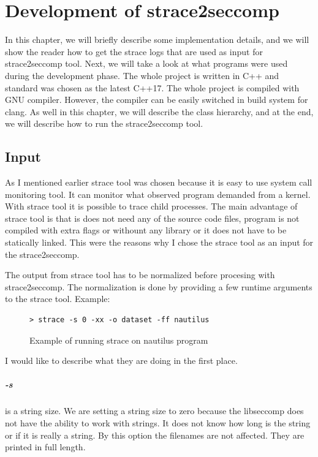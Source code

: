 \chapter{Development of strace2seccomp}
In this chapter, we will briefly describe some implementation details, and we
will show the reader how to get the strace logs that are used as input for
strace2seccomp tool. Next, we will take a look at what programs were used during
the development phase. The whole project is written in C++ and standard was
chosen as the latest C++17. The whole project is compiled with GNU compiler.
However, the compiler can be easily switched in build system for clang. As well
in this chapter, we will describe the class hierarchy, and at the end, we will
describe how to run the strace2seccomp tool.

\section{Input}
\label{strace_params}
As I mentioned earlier strace tool was chosen because it is easy to use system
call monitoring tool. It can monitor what observed program demanded from a
kernel. With strace tool it is possible to trace child processes. The main
advantage of strace tool is that is does not need any of the source code files,
program is not compiled with extra flags or withount any library or it does not
have to be statically linked. This were the reasons why I chose the strace tool
as an input for the strace2seccomp.

The output from strace tool has to be normalized before procesing with strace2seccomp.
The normalization is done by providing a few runtime arguments to the strace tool.
Example:

\begin{figure}[H]
	\lstset{style=npl}
\begin{lstlisting}
> strace -s 0 -xx -o dataset -ff nautilus
\end{lstlisting}
	\caption{Example of running strace on nautilus program}
	\label{strace_example}
\end{figure}

I would like to describe what they are doing in the first place\cite{strace_man}.

\paragraph{-s} is a string size. We are setting a string size to zero because
the libseccomp does not have the ability to work with strings. It does not know
how long is the string or if it is really a string. By this option the filenames
are not affected. They are printed in full length.

